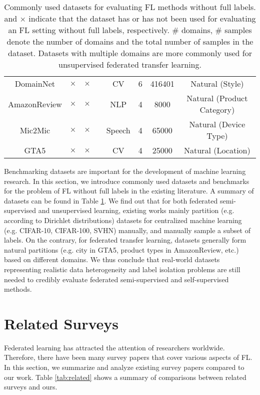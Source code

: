\documentclass[11pt]{article}
\newcommand{\cmark}{\ding{51}}
\begin{document}
\begin{table}[]
{\begin{tabular}{cccccccc}
        DomainNet & $\times$ & $\times$ & \cmark \cite{Yilun-peng2020federated,Yilun-gan2022fruda} & CV & 6 & 416401 & Natural (Style)\\
        AmazonReview & $\times$ & $\times$ & \cmark \cite{Yilun-peng2020federated} & NLP & 4 & 8000 & Natural (Product Category)\\
        Mic2Mic & $\times$ & $\times$ & \cmark \cite{Yilun-gan2022fruda} & Speech & 4 & 65000 & Natural (Device Type)\\
        GTA5 & $\times$ & $\times$ & \cmark \cite{Yilun-yao2022federated} & CV & 4 & 25000 & Natural (Location)\\

    \bottomrule
    \end{tabular}}
    \caption{Commonly used datasets for evaluating FL methods without full labels. \cmark and $\times$ indicate that the dataset has or has not been used for evaluating an FL setting without full labels, respectively. \# domains, \# samples denote the number of domains and the total number of samples in the dataset. Datasets with multiple domains are more commonly used for unsupervised federated transfer learning. }
    \label{tab:flud_dataset}
\end{table}
Benchmarking datasets are important for the development of machine learning research. In this section, we introduce commonly used datasets and benchmarks for the problem of FL without full labels in the existing literature. A summary of datasets can be found in Table \ref{tab:flud_dataset}. We find out that for both federated semi-supervised and unsupervised learning, existing works mainly partition (e.g. according to Dirichlet distributions) datasets for centralized machine learning (e.g. CIFAR-10, CIFAR-100, SVHN) manually, and manually sample a subset of labels. On the contrary, for federated transfer learning, datasets generally form natural partitions (e.g. city in GTA5, product types in AmazonReview, etc.) based on different domains. We thus conclude that real-world datasets representing realistic data heterogeneity and label isolation problems are still needed to credibly evaluate federated semi-supervised and self-supervised methods.

\section{Related Surveys}\label{sec:related}
Federated learning has attracted the attention of researchers worldwide. Therefore, there have been many survey papers that cover various aspects of FL. In this section, we summarize and analyze existing survey papers compared to our work. Table \ref{tab:related} shows a summary of comparisons between related surveys and ours.
\end{document}

